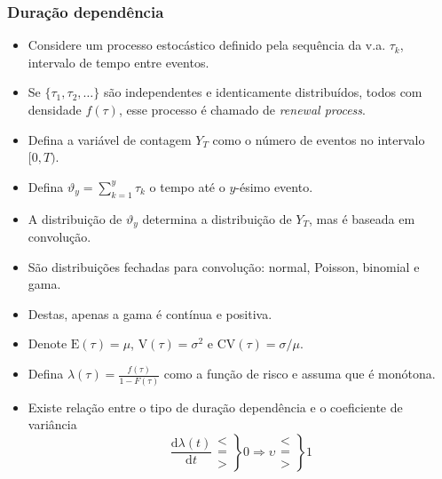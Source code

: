 \documentclass[10pt, aspectratio=169]{beamer}\usepackage[]{graphicx}\usepackage[]{color}
\begin{document}
\begin{frame}[allowframebreaks]
  \frametitle{Duração dependência}
  \begin{itemize}
  \item Considere um processo estocástico definido pela sequência da
    v.a. $\tau_k$, intervalo de tempo entre eventos.
  \item Se $\{\tau_1, \tau_2,\ldots\}$ são independentes e identicamente
    distribuídos, todos com densidade $f(\tau)$, esse processo é chamado
    de \emph{renewal process}.
  \item Defina a variável de contagem $Y_T$ como o número de eventos no
    intervalo $[0,T)$.
  \item Defina $\vartheta_y = \sum_{k=1}^{y} \tau_k$ o tempo até o
    $y$-ésimo evento.
  \item A distribuição de $\vartheta_y$ determina a distribuição de
    $Y_T$, mas é baseada em convolução.
  \item São distribuições fechadas para convolução: normal, Poisson,
    binomial e gama.
  \item Destas, apenas a gama é contínua e positiva.

    \framebreak

  \item Denote $\text{E}(\tau) = \mu$, $\text{V}(\tau) = \sigma^2$ e
    $\text{CV}(\tau) = \sigma/\mu$.
  \item Defina $\lambda(\tau) = \frac{f(\tau)}{1-F(\tau)}$ como a função
    de risco e assuma que é monótona.
  \item Existe relação entre o tipo de duração dependência e o
    coeficiente de variância
    \begin{equation}
      \frac{\text{d}\lambda(t)}{\text{d}t} \left.\begin{matrix}
          < \\
          = \\
          >
        \end{matrix}\right\} 0 \Rightarrow
      \upsilon \left.\begin{matrix}
          < \\
          = \\
          >
        \end{matrix}\right\} 1
    \end{equation}
  \end{itemize}
\end{frame}
\end{document}
